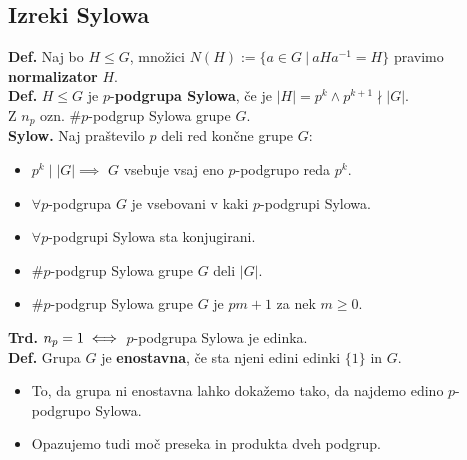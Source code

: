 \documentclass[a4paper,oneside,8pt,landscape]{extarticle}
\begin{document}
\begin{multicols*}{3}
\section{Izreki Sylowa}
\textbf{Def.} Naj bo $H\leq G$, množici $N(H) := \{a\in G\ | \ aHa^{-1} = H\}$ pravimo \textbf{normalizator} $H$.\\
\textbf{Def.} $H\leq G$ je $p$-\textbf{podgrupa Sylowa}, če je $|H|=p^k \land p^{k+1} \nmid |G|$.\\ Z $n_p$  ozn. $\# p$-podgrup Sylowa grupe $G$.\\
\textbf{Sylow.} Naj praštevilo $p$ deli red končne grupe $G$:
\begin{itemize}
    \item $p^k \mid |G| \implies $ $G$ vsebuje vsaj eno $p$-podgrupo reda $p^k$.
    \item $\forall p$-podgrupa $G$ je vsebovani v kaki $p$-podgrupi Sylowa.
    \item $\forall p$-podgrupi Sylowa sta konjugirani.
    \item $\# p$-podgrup Sylowa grupe $G$ deli $|G|$.
    \item $\# p$-podgrup Sylowa grupe $G$ je $pm+1$ za nek $m\geq 0$.
\end{itemize}
\textbf{Trd.} \(n_p = 1 \iff\) \(p\)-podgrupa Sylowa je edinka.\\
\textbf{Def.} Grupa $G$ je \textbf{enostavna}, če sta njeni edini edinki $\{1\}$ in $G$.
\begin{itemize}
    \item To, da grupa ni enostavna lahko dokažemo tako, da najdemo edino \(p\)-podgrupo Sylowa.
    \item Opazujemo tudi moč preseka in produkta dveh podgrup.
\end{itemize}
%
%

\end{multicols*}
\end{document}
